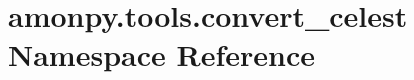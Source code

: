 \hypertarget{namespaceamonpy_1_1tools_1_1convert__celest}{\section{amonpy.\-tools.\-convert\-\_\-celest Namespace Reference}
\label{namespaceamonpy_1_1tools_1_1convert__celest}
}
